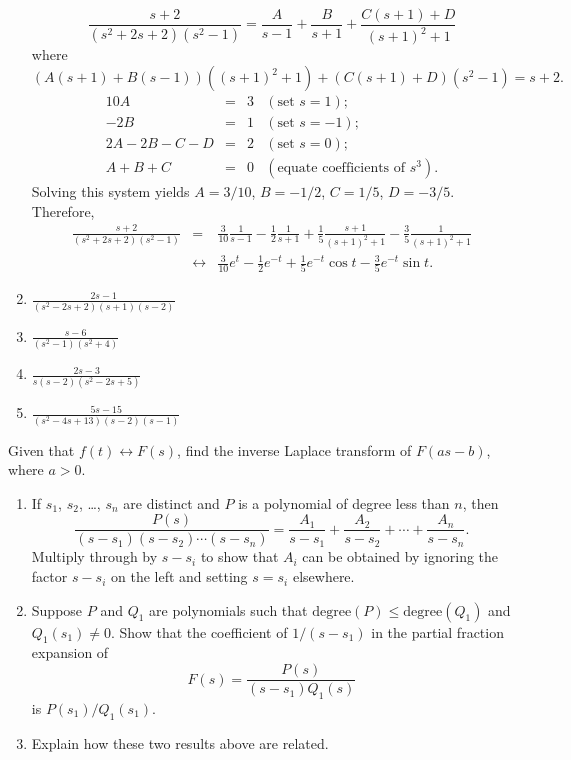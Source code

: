 \documentclass{ximera}
\begin{document}
\begin{problem}
\begin{enumerate}
\begin{solution}
$$
\frac{s+2}{(s^2+2s+2)(s^2-1)}
=\frac{A}{s-1}+\frac{B}{s+1}+\frac{C(s+1)+D}{(s+1)^2+1}
$$
where
$$
(A(s+1)+B(s-1))((s+1)^2+1)+(C(s+1)+D)(s^2-1)=s+2.
$$
$$
\begin{array}{rcrl}
10A&=&3&(\mbox{set }s=1);\\
-2B&=&1& (\mbox{set }s=-1);\\
2A-2B-C-D&=&2& (\mbox{set }s=0);\\
A+B+C&=&0&(\mbox{equate coefficients of }s^3).
\end{array}
$$
Solving this system yields $A=3/10$, $B=-1/2$,
$C=1/5$, $D=-3/5$. Therefore,
\begin{eqnarray*}
\frac{s+2}{(s^2+2s+2)(s^2-1)}
&=&
\frac{3}{10}\frac{1}{s-1}-\frac{1}{2}\frac{1}{s+1}+\frac{1}{5}\frac{s+1}{(s+1)^2+1}
-\frac{3}{5}\frac{1}{(s+1)^2+1}
\\&\leftrightarrow&
\frac{3}{10}e^{t}-\frac{1}{2}e^{-t}
+\frac{1}{5}e^{-t}\cos t-\frac{3}{5}e^{-t}\sin t.
\end{eqnarray*}
\end{solution}

\item $\frac{2s-1}{(s^2-2s+2)(s+1)(s-2)}$



    \item $\frac{s-6}{(s^2-1)(s^2+4)}$
    \item $\frac{2s-3}{s(s-2)(s^2-2s+5)}$
    \item $\frac{5s-15}{(s^2-4s+13)(s-2)(s-1)}$
\end{enumerate}
\end{problem}

\begin{problem}\label{exer:8.2.9}
 Given that $f(t)\leftrightarrow F(s)$, find the inverse
Laplace transform of $F(as-b)$, where $a>0$.
\end{problem}

\begin{problem}\label{exer:8.2.10}
\begin{enumerate}
\item  %
If $s_1$, $s_2$, \dots, $s_n$ are distinct and $P$ is a polynomial of
degree less than $n$, then
$$
\frac{P(s)}{(s-s_1)(s-s_2)\cdots(s-s_n)}=
\frac{A_1}{s-s_1}+\frac{A_2}{s-s_2}+\cdots+\frac{A_n}{s-s_n}.
$$
Multiply through by $s-s_i$ to show that
 $A_i$ can be obtained by ignoring the factor $s-s_i$ on the
left and setting $s=s_i$ elsewhere.
\item %
Suppose $P$ and $Q_1$ are polynomials such that
$\text{degree}(P)\le\text{degree}(Q_1)$ and $Q_1(s_1)\ne0$.
Show that the coefficient of $1/(s-s_1)$ in the partial fraction
expansion of
$$
F(s)=\frac{P(s)}{(s-s_1)Q_1(s)}
$$
is $P(s_1)/Q_1(s_1)$.
\item %
Explain how these two results above are related.
\end{enumerate}
\end{problem}
\end{document}
